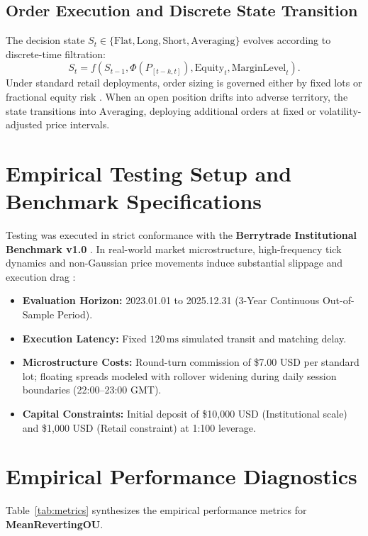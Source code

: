 \documentclass[11pt,a4paper]{article}
\begin{document}
\subsection{Order Execution and Discrete State Transition}
The decision state $S_t \in \{\text{Flat}, \text{Long}, \text{Short}, \text{Averaging}\}$ evolves according to discrete-time filtration:
\begin{equation}
S_{t} = f(S_{t-1}, \Phi(P_{[t-k, t]}), \text{Equity}_t, \text{MarginLevel}_t).
\end{equation}
Under standard retail deployments, order sizing is governed either by fixed lots or fractional equity risk \cite{lopez2018advances, carhart1997persistence}. When an open position drifts into adverse territory, the state transitions into $\text{Averaging}$, deploying additional orders at fixed or volatility-adjusted price intervals.

\section{Empirical Testing Setup and Benchmark Specifications}
Testing was executed in strict conformance with the \textbf{Berrytrade Institutional Benchmark v1.0} \cite{artsu2026illusion}. In real-world market microstructure, high-frequency tick dynamics and non-Gaussian price movements induce substantial slippage and execution drag \cite{kyle1985continuous, amihud2002illiquidity, cont2001empirical, mandelbrot1963variation}:
\begin{itemize}
    \item \textbf{Evaluation Horizon:} 2023.01.01 to 2025.12.31 (3-Year Continuous Out-of-Sample Period).
    \item \textbf{Execution Latency:} Fixed $120\,\text{ms}$ simulated transit and matching delay.
    \item \textbf{Microstructure Costs:} Round-turn commission of \$7.00 USD per standard lot; floating spreads modeled with rollover widening during daily session boundaries (22:00--23:00 GMT).
    \item \textbf{Capital Constraints:} Initial deposit of \$10,000 USD (Institutional scale) and \$1,000 USD (Retail constraint) at 1:100 leverage.
\end{itemize}

\section{Empirical Performance Diagnostics}
Table~\ref{tab:metrics} synthesizes the empirical performance metrics for \textbf{MeanRevertingOU}.
\end{document}
